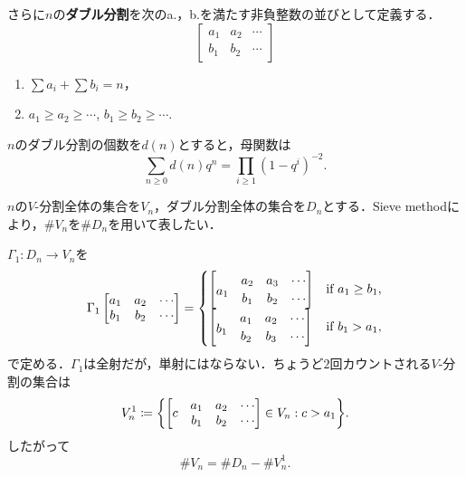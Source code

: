 \documentclass[xelatex,ja=standard,a4paper,14pt,everyparhook=compat]{bxjsarticle}
\newcommand{\up}[1]{\smash{\raisebox{.5\normalbaselineskip}{$#1$}}}
\theoremstyle{definition}
\begin{document}
さらに$n$の\textbf{ダブル分割}を次のa.，b.を満たす非負整数の並びとして定義する．
\begin{equation*}
    \begin{bmatrix}
        a_1 & a_2 & \cdots \\
        b_1 & b_2 & \cdots
    \end{bmatrix}
\end{equation*}
\begin{enumerate}[label=\alph*.]
    \item $\sum a_i + \sum b_i = n$，
    \item $a_1 \geq a_2 \geq \cdots$, $b_1 \geq b_2 \geq \cdots$.
\end{enumerate}

\newpage

$n$のダブル分割の個数を$d(n)$とすると，母関数は \begin{equation*}
    \sum_{n \geq 0} d(n) q^n = \prod_{i \geq 1} (1-q^i)^{-2}.
\end{equation*}

$n$の$V$-分割全体の集合を$V_n$，ダブル分割全体の集合を$D_n$とする．Sieve methodにより，$\#V_n$を$\#D_n$を用いて表したい．

$\Gamma_1: D_n \to V_n$を \begin{equation*}
    \Gamma_1 \begin{bmatrix}
        a_1 & a_2 & \cdots \\
        b_1 & b_2 & \cdots
    \end{bmatrix} = \begin{cases}
        \begin{bmatrix}
                     & a_2 & a_3 & \cdots \\
            \up{a_1} & b_1 & b_2 & \cdots
        \end{bmatrix} & \text{if $a_1 \geq b_1$}, \\
        \begin{bmatrix}
                     & a_1 & a_2 & \cdots \\
            \up{b_1} & b_2 & b_3 & \cdots
        \end{bmatrix} & \text{if $b_1 > a_1$},
    \end{cases}
\end{equation*}
で定める．$\Gamma_1$は全射だが，単射にはならない．ちょうど$2$回カウントされる$V$-分割の集合は \begin{equation*}
    V_n^1 \coloneqq \mleft\{ \begin{bmatrix}
               & a_1 & a_2 & \cdots \\
        \up{c} & b_1 & b_2 & \cdots
    \end{bmatrix} \in V_n : c > a_1 \mright\}.
\end{equation*}
したがって \begin{equation*}
    \#V_n = \#D_n - \#V_n^1.
\end{equation*}
\end{document}
